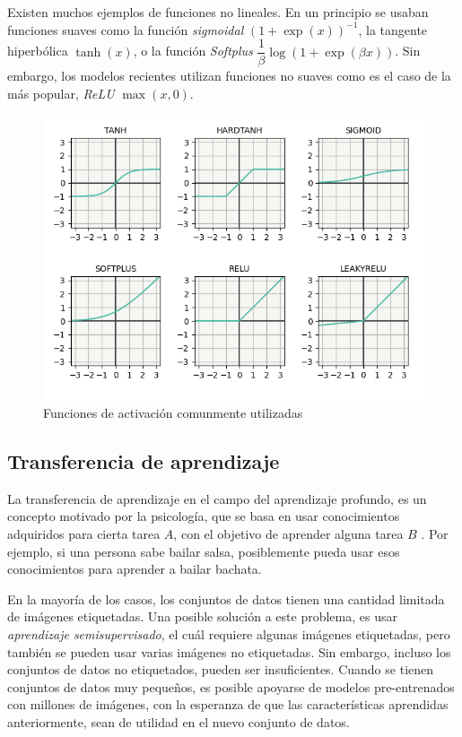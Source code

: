     Existen muchos ejemplos de funciones no lineales. En un principio se usaban funciones suaves como la función \textsl{sigmoidal} $(1+\exp(x))^{-1}$, la tangente hiperbólica $\tanh(x)$, o la función \textsl{Softplus} $\dfrac{1}{\beta} \log(1+ \exp(\beta x))$. Sin embargo, los  modelos recientes utilizan  funciones no suaves como es el caso de la más popular,  \textsl{ReLU} $\max(x,0)$.

    \begin{figure}[H]
        \centering
        \includegraphics[width=6in]{../cap1_preliminares/src/activations.png}
        \caption{Funciones de activación comunmente utilizadas}
    \end{figure}
    
    \subsection{Transferencia de aprendizaje}
    La transferencia de aprendizaje en el campo del aprendizaje profundo, es un concepto motivado por la psicología, que se basa en usar conocimientos adquiridos para cierta tarea $A$, con el objetivo de aprender alguna tarea $B$ \cite{transfer}. Por ejemplo, si una persona sabe bailar salsa, posiblemente pueda usar esos conocimientos para aprender a bailar bachata. 

    En la mayoría de los casos, los conjuntos de datos tienen una cantidad limitada de imágenes etiquetadas. Una posible solución a este problema, es usar \textsl{aprendizaje semisupervisado}, el cuál requiere algunas imágenes etiquetadas, pero también se pueden usar varias imágenes no etiquetadas. Sin embargo, incluso los conjuntos de datos no etiquetados, pueden ser insuficientes. Cuando se tienen conjuntos de datos muy pequeños, es posible apoyarse de modelos pre-entrenados con millones de imágenes, con la esperanza de que las características aprendidas anteriormente, sean de utilidad en el nuevo conjunto de datos.
